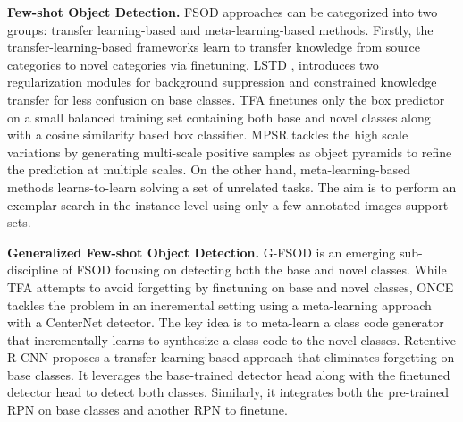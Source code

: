 \documentclass[10pt,twocolumn,letterpaper]{article}
\begin{document}
\textbf{Few-shot Object Detection.} FSOD approaches can be categorized into two groups: transfer learning-based and meta-learning-based methods. Firstly, the transfer-learning-based frameworks \cite{LSTD, TFA, MPSR} learn to transfer knowledge from source categories to novel categories via finetuning. LSTD \cite{LSTD}, introduces two regularization modules for background suppression and constrained knowledge transfer for less confusion on base classes. TFA \cite{TFA} finetunes only the box predictor on a small balanced training set containing both base and novel classes along with a cosine similarity based box classifier. MPSR \cite{MPSR} tackles the high scale variations by generating multi-scale positive samples as object pyramids to refine the prediction at multiple scales. On the other hand,  meta-learning-based methods \cite{FSRW, MetaDet, MetaRCNN, FSOD-RPN, FsDetView, CME} learns-to-learn solving a set of unrelated tasks. The aim is to perform an exemplar search in the instance level using only a few annotated images support sets. 

\textbf{Generalized Few-shot Object Detection.} G-FSOD \cite{TFA, ONCE, gfsod} is an emerging sub-discipline of FSOD focusing on detecting both the base and novel classes. While TFA \cite{TFA} attempts to avoid forgetting by finetuning on base and novel classes, ONCE \cite{ONCE} tackles the problem in an incremental setting using a meta-learning approach with a CenterNet \cite{center-net} detector. The key idea is to meta-learn a class code generator that incrementally learns to synthesize a class code to the novel classes. Retentive R-CNN \cite{gfsod} proposes a transfer-learning-based approach that eliminates forgetting on base classes. It leverages the base-trained detector head along with the finetuned detector head to detect both classes. Similarly, it integrates both the pre-trained RPN on base classes and another RPN to finetune. 
\end{document}
